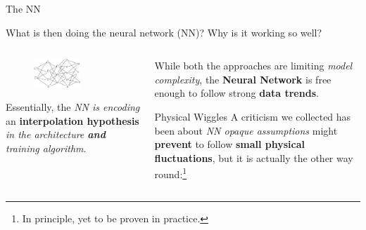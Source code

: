 \documentclass[9pt]{beamer}
\begin{document}
\begin{frame}{The NN}
    \begin{center}
        What is then doing the neural network (NN)? Why is it working so well?
    \end{center}
    \vspace*{10pt}

    \begin{columns}
        \begin{column}{0.5\textwidth}
            \begin{figure}
                \centering
                \includegraphics[width=0.6\textwidth]{nn}
            \end{figure}

            \vspace*{10pt}
                Essentially, the \textit{NN is encoding} an
                \alert{\textbf{interpolation hypothesis}} \textit{in the
                architecture \textbf{and} training algorithm}.
        \end{column}
        \begin{column}{0.5\textwidth}
            While both the approaches are limiting \textit{model complexity},
            the \textbf{Neural Network} is free enough to follow strong
            \textbf{data trends}.

            \vspace*{10pt}
            \begin{exampleblock}{Physical Wiggles}
                A criticism we collected has been about \textit{NN opaque
                assumptions} might \textbf{prevent} to follow \textbf{small
                physical fluctuations}, but it is actually the other way
                round:\footnote{In principle, yet to be proven in practice.}


\end{exampleblock}
\end{column}
\end{columns}
\end{frame}
\end{document}
